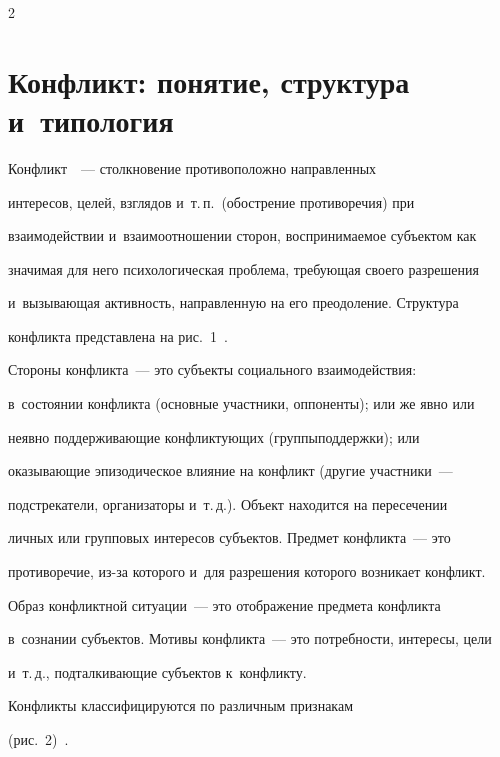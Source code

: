 \begin{multicols}{2}
  

\section{Конфликт: понятие, структура и~типология}



\vspace*{-2pt}



  Конфликт~\cite{8-r, 9-r}~--- столкновение противоположно направленных 

интересов, целей, взглядов и~т.\,п.\ (обострение противоречия) при 

взаимодействии и~взаимоотношении сторон, вос\-при\-ни\-ма\-емое субъектом как 

значимая для него психологическая проблема, требующая своего разрешения 

и~вызывающая активность, направленную на его преодоление. Структура 

конфликта представлена на рис.~1~\cite{10-r, 11-r}. 







  Стороны конфликта~--- это субъекты социального взаимодействия: 

в~состоянии конфликта (основные участники, оппоненты); или же явно или 

неявно поддерживающие конфликтующих (группы\linebreak поддержки); или 

оказывающие эпизодическое влияние на конфликт (другие участники~--- 

подстрекатели, организаторы и~т.\,д.). Объект находится на пересечении 

личных или групповых интересов субъектов. Предмет конфликта~--- это 

противоречие, из-за которого и~для разрешения которого возникает конфликт. 

Образ конфликтной ситуации~--- это отображение предмета конфликта 

в~сознании субъектов. Мотивы конфликта~--- это потребности, интересы, цели 

и~т.\,д., подталкивающие субъектов к~конфликту. 

  

  Конфликты классифицируются по различным признакам  

(рис.~2)~\cite{8-r, 10-r}. 


\end{multicols}
